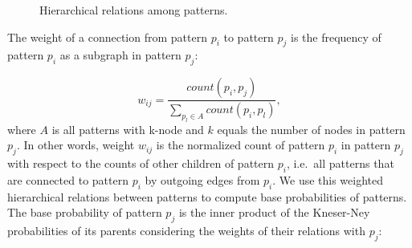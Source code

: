 \begin{figure}[!t]
\begin{center}
{
  }
  \end{center}
  \caption{Hierarchical relations among patterns.} 
  \label{fig:parent-child-rel}
\end{figure}


The weight of a connection from pattern $p_i$ to pattern $p_j$ is the frequency of pattern $p_i$ as a subgraph in pattern $p_j$:

\begin{equation}
\label{eq:weights}
w_{ij} = \frac{count(p_i, p_j)}{\sum_{p_l \in A}count(p_i,p_l)},
\end{equation}
%
where $A$ is all patterns with k-node and $k$ equals the number of nodes in pattern $p_j$. 
In other words, weight $w_{ij}$ is the normalized count of pattern $p_i$ in pattern $p_j$ with respect to the counts of  other children of pattern  $p_i$, i.e.\ all patterns that are connected to pattern $p_i$ by outgoing edges from $p_i$.  
We use this weighted hierarchical relations between patterns to compute base probabilities of patterns. 
The base probability of pattern $p_j$ is the inner product
of the \mbox{Kneser-Ney} probabilities of its parents considering the weights of their relations with $p_j$:

